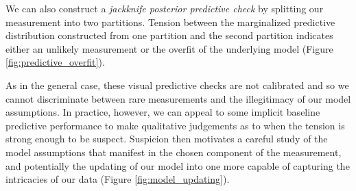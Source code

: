 \begin{figure*}
\centering
{}
\caption{(a) When the measurement, $d$, is consistent with the 
posterior predictive distribution we have no reason to doubt our 
model assumptions, but (b) tension between the measurement and
the posterior predictive distribution indicates that there may be a
problem.  Either the measurement was exceedingly rare or our
model assumptions are insufficient.
}
\label{fig:predictive_misfit}
\end{figure*}

We can also construct a \emph{jackknife posterior predictive
check} by splitting our measurement into two partitions.  Tension
between the marginalized predictive distribution constructed from
one partition and the second partition indicates either an unlikely
measurement or the overfit of the underlying model (Figure
 \ref{fig:predictive_overfit}).

\begin{figure*}
\centering
{}
\caption{To test for potential overfit we need multiple measurements,
and given only a single measurement this can emulated by splitting
the measurement into two partitions, $d_{1}$ and $d_{2}$.  (a) When 
both measurements are consistent with the posterior predictive 
distribution we have no reason to doubt our model assumptions, but 
(b) tension between the held-out measurement, $d_{2}$ and the 
posterior predictive distribution indicates that the model might be
overfitting to $d_{1}$.  Either the partition generated an exceedingly 
rare measurement or our model assumptions are insufficient.
}
\label{fig:predictive_overfit}
\end{figure*}

As in the general case, these visual predictive checks are not
calibrated and so we cannot discriminate between rare 
measurements and the illegitimacy of our model assumptions.
In practice, however, we can appeal to some implicit baseline
predictive performance to make qualitative judgements as to 
when the tension is strong enough to be suspect.  Suspicion 
then motivates a careful study of the model assumptions that 
manifest in the chosen component of the measurement, and 
potentially the updating of our model into one more capable 
of capturing the intricacies of our data (Figure \ref{fig:model_updating}).

